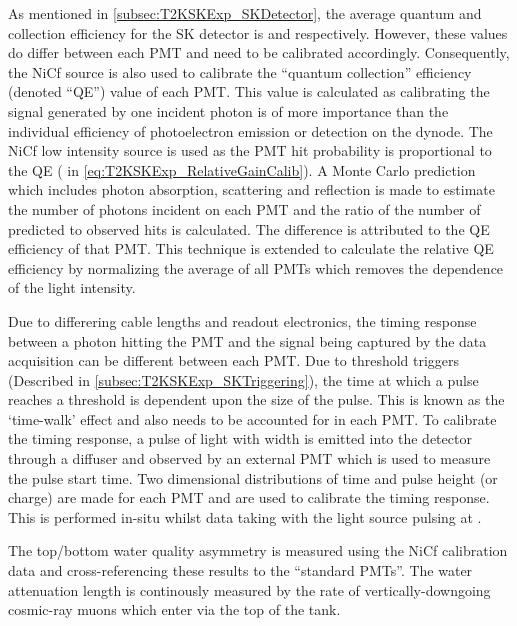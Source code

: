 As mentioned in \autoref{subsec:T2KSKExp_SKDetector}, the average quantum and collection efficiency for the SK detector is  and  respectively. However, these values do differ between each PMT and need to be calibrated accordingly. Consequently, the NiCf source is also used to calibrate the ``quantum \quickmath{\times} collection'' efficiency (denoted ``QE'') value of each PMT. This value is calculated as calibrating the signal generated by one incident photon is of more importance than the individual efficiency of photoelectron emission or detection on the dynode. The NiCf low intensity source is used as the PMT hit probability is proportional to the QE ( in \autoref{eq:T2KSKExp_RelativeGainCalib}). A Monte Carlo prediction which includes photon absorption, scattering and reflection is made to estimate the number of photons incident on each PMT and the ratio of the number of predicted to observed hits is calculated. The difference is attributed to the QE efficiency of that PMT. This technique is extended to calculate the relative QE efficiency by normalizing the average of all PMTs which removes the dependence of the light intensity.

Due to differering cable lengths and readout electronics, the timing response between a photon hitting the PMT and the signal being captured by the data acquisition can be different between each PMT. Due to threshold triggers (Described in \autoref{subsec:T2KSKExp_SKTriggering}), the time at which a pulse reaches a threshold is dependent upon the size of the pulse. This is known as the `time-walk' effect and also needs to be accounted for in each PMT. To calibrate the timing response, a pulse of light with width  is emitted into the detector through a diffuser and observed by an external PMT which is used to measure the pulse start time. Two dimensional distributions of time and pulse height (or charge) are made for each PMT and are used to calibrate the timing response. This is performed in-situ whilst data taking with the light source pulsing at .

The top/bottom water quality asymmetry is measured using the NiCf calibration data and cross-referencing these results to the ``standard PMTs''. The water attenuation length is continously measured by the rate of vertically-downgoing cosmic-ray muons which enter via the top of the tank.

